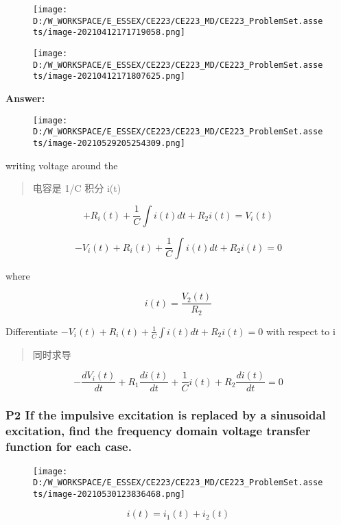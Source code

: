 \documentclass[
]{article}
\begin{document}
\begin{figure}
\centering
\texttt{[image: D:/W\_WORKSPACE/E\_ESSEX/CE223/CE223\_MD/CE223\_ProblemSet.assets/image-20210412171719058.png]}
\caption{}
\end{figure}

\begin{figure}
\centering
\texttt{[image: D:/W\_WORKSPACE/E\_ESSEX/CE223/CE223\_MD/CE223\_ProblemSet.assets/image-20210412171807625.png]}
\caption{}
\end{figure}

\textbf{Answer:}

\begin{figure}
\centering
\texttt{[image: D:/W\_WORKSPACE/E\_ESSEX/CE223/CE223\_MD/CE223\_ProblemSet.assets/image-20210529205254309.png]}
\caption{}
\end{figure}

writing voltage around the

\begin{quote}
电容是 1/C 积分 i(t)
\end{quote}

\[+ R_i(t) + \frac{1}{C}\int i(t)dt +R_2 i(t) = V_i(t)\]

\[-V_i(t) + R_i(t) + \frac{1}{C}\int i(t)dt +R_2 i(t) = 0\]

where

\[i(t) =\frac{V_2(t)}{R_2}\]

Differentiate
\(-V_i(t) + R_i(t) + \frac{1}{C}\int i(t)dt +R_2 i(t) = 0\) with respect
to i

\begin{quote}
同时求导
\end{quote}

\[-\frac{d V_i(t)}{dt} + R_1 \frac{d i(t)}{dt} + \frac{1}{C}i(t) + R_2 \frac{d i(t) }{dt} = 0\]

\hypertarget{header-n169}{%
\subsubsection{P2 If the impulsive excitation is replaced by a
sinusoidal excitation, find the frequency domain voltage transfer
function for each case.}\label{header-n169}}

\begin{figure}
\centering
\texttt{[image: D:/W\_WORKSPACE/E\_ESSEX/CE223/CE223\_MD/CE223\_ProblemSet.assets/image-20210530123836468.png]}
\caption{}
\end{figure}

\[i(t) = i_1(t) +i_2(t)\]
\end{document}
